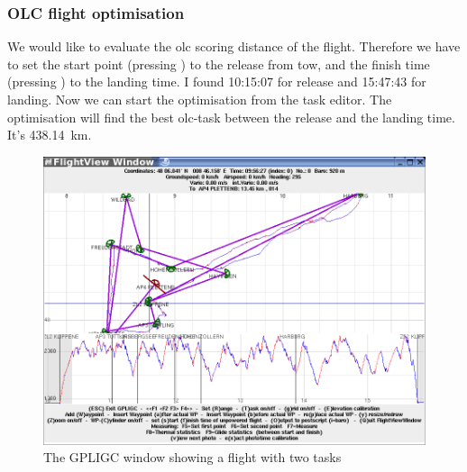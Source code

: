 \subsubsection{OLC flight optimisation}
We would like to evaluate the olc scoring distance of the flight. Therefore we have to set the start
point (pressing ) to the release from tow, and the finish time (pressing ) to the landing time.
I found 10:15:07 for release and 15:47:43 for landing. Now we can start the optimisation from the task editor.
The optimisation will find the best olc-task between the release and the landing time. It's 438.14~km.

\begin{figure}[h]
\caption{\label{flightview}The GPLIGC window showing a flight with two tasks}
\begin{center}
\includegraphics[width=\textwidth]{png/flightview-1}
\end{center}
\end{figure}

